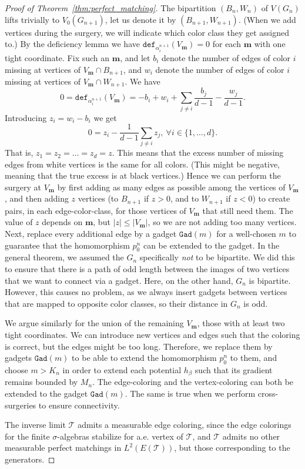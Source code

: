\documentclass[10pt]{article}
\theoremstyle{plain}
\theoremstyle{remark}
\newcommand{\1}{\mathbbm{1}}
\newcommand{\mcT}{\mathcal{T}}
\numberwithin{equation}{section}
\begin{document}
\begin{proof}[Proof of Theorem~\ref{thm:perfect_matching}]
The bipartition $(B_n, W_n)$ of $V(G_n)$ lifts trivially to $V_0(G_{n+1})$, let us denote it by $(B_{n+1}, W_{n+1})$. (When we add vertices during the surgery, we will indicate which color class they get assigned to.)  By the deficiency lemma we have $ \texttt{def}_{\alpha^{n+1}_i}(V_{\mathbf{m}}) =0$ for each $\mathbf{m}$ with one tight coordinate. Fix such an $\mathbf{m}$, and let $b_i$ denote the number of edges of color $i$ missing at vertices of $V_{\mathbf{m}} \cap B_{n+1}$, and $w_i$ denote the number of edges of color $i$ missing at vertices of $V_{\mathbf{m}} \cap W_{n+1}$. We have
\[0= \texttt{def}_{\alpha^{n+1}_i}(V_{\mathbf{m}}) = -b_i + w_i + \sum_{j \neq i} \frac{b_j}{d-1}-\frac{w_j}{d-1}.\]
Introducing $z_i=w_i-b_i$ we get 
\[0= z_i - \frac{1}{d-1}\sum_{j\neq i}z_j, \ \forall i\in \{1,\ldots,d\}.\]
That is, $z_1=z_2=\ldots=z_d = z$. This means that the excess number of missing edges from white vertices is the same for all colors. (This might be negative, meaning that the true excess is at black vertices.) Hence we can perform the surgery at $V_{\mathbf{m}}$ by first adding as many edges as possible among the vertices of $V_{\mathbf{m}}$, and then adding $z$ vertices (to $B_{n+1}$ if $z>0$, and to $W_{n+1}$ if $z <0$) to create pairs, in each edge-color-class, for those vertices of $V_{\mathbf{m}}$ that still need them. The value of $z$ depends on $\mathbf{m}$, but $|z| \leq |V_{\mathbf{m}}|$, so we are not adding too many vertices. Next, replace every additional edge by a gadget $\texttt{Gad}(m)$ for a well-chosen $m$ to guarantee that the homomorphism $p_0^n$ can be extended to the gadget. 
In the general theorem, we assumed the $G_n$ specifically \emph{not} to be bipartite. We did this to ensure that there is a path of odd length between the images of two vertices that we want to connect via a gadget. Here, on the other hand, $G_n$ is bipartite. However, this causes no problem, as we always insert gadgets between vertices that are mapped to opposite color classes, so their distance in $G_n$ is odd.


We argue similarly for the union of the remaining $V_{\mathbf{m}}$, those with at least two tight coordinates. We can introduce new vertices and edges such that the coloring is correct, but the edges might be too long. Therefore, we replace them by gadgets $\texttt{Gad}(m)$ to be able to extend the homomorphism $p_0^n$ to them, and choose $m > K_n$ in order to extend each potential $h_{\beta}$ such that its gradient remains bounded by $M_n$. The edge-coloring and the vertex-coloring can both be extended to the gadget $\texttt{Gad}(m)$. The same is true when we perform cross-surgeries to ensure connectivity.

The inverse limit $\mcT$ admits a measurable edge coloring, since the edge colorings for the finite $\sigma$-algebras stabilize for a.e. vertex of $\mcT$, and $\mcT$ admits no other measurable perfect matchings in $L^2(E(\mcT))$, but those corresponding to the generators.
\end{proof}
\end{document}
